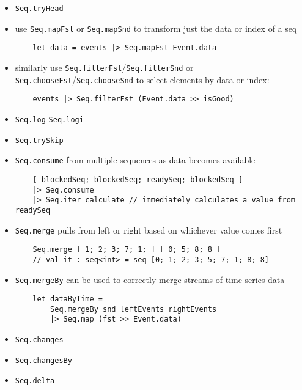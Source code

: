 \documentclass{article}
\begin{document}
\begin{itemize}

\item \texttt{Seq.tryHead}

\item use \texttt{Seq.mapFst} or \texttt{Seq.mapSnd} to transform just the data or index of a seq
\begin{verbatim}
    let data = events |> Seq.mapFst Event.data
\end{verbatim}

\item similarly use \texttt{Seq.filterFst}/\texttt{Seq.filterSnd} or \texttt{Seq.chooseFst}/\texttt{Seq.chooseSnd} to select elements by data or index:

\begin{verbatim}
    events |> Seq.filterFst (Event.data >> isGood)
\end{verbatim}

\item \texttt{Seq.log} \texttt{Seq.logi}

\item \texttt{Seq.trySkip}

\item \texttt{Seq.consume} from multiple sequences as data becomes available
\begin{verbatim}
    [ blockedSeq; blockedSeq; readySeq; blockedSeq ]
    |> Seq.consume
    |> Seq.iter calculate // immediately calculates a value from readySeq
\end{verbatim}

\item \texttt{Seq.merge} pulls from left or right based on whichever value comes first
\begin{verbatim}
    Seq.merge [ 1; 2; 3; 7; 1; ] [ 0; 5; 8; 8 ]
    // val it : seq<int> = seq [0; 1; 2; 3; 5; 7; 1; 8; 8]
\end{verbatim}

\item \texttt{Seq.mergeBy} can be used to correctly merge streams of time series data
\begin{verbatim}
    let dataByTime =
        Seq.mergeBy snd leftEvents rightEvents
        |> Seq.map (fst >> Event.data)
\end{verbatim}

\item \texttt{Seq.changes}

\item \texttt{Seq.changesBy}

\item \texttt{Seq.delta}

\end{itemize}
\end{document}
